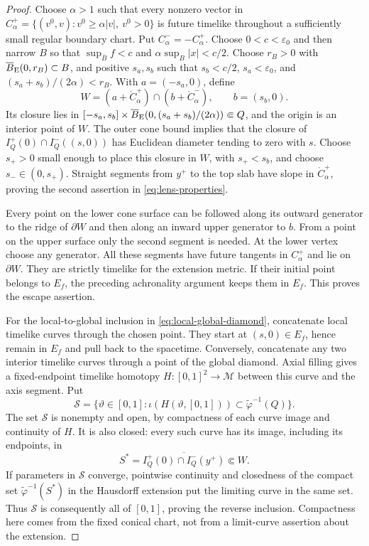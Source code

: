 \documentclass[10pt,a4paper]{article}
\numberwithin{equation}{section}
\theoremstyle{definition}
\theoremstyle{remark}
\newcommand{\cM}{\mathcal M}
\newcommand{\eps}{\varepsilon}
\begin{document}
\begin{proof}
Choose $\alpha>1$ such that every nonzero vector in
$C_\alpha^+=\{(v^0,v):v^0\ge\alpha|v|,\ v^0>0\}$ is future timelike
throughout a sufficiently small regular boundary chart.  Put
$C_\alpha^-=-C_\alpha^+$.  Choose $0<c<\eps_0$ and then narrow $B$ so that
$\sup_{\overline B}f<c$ and $\alpha\sup_B|x|<c/2$.
Choose $r_B>0$ with $\overline B_{\rm E}(0,r_B)\subset B$, and positive
$s_a,s_b$ such that $s_b<c/2$, $s_a<\eps_0$, and
$(s_a+s_b)/(2\alpha)<r_B$.  With $a=(-s_a,0)$, define
\[
 W=(a+\mathring C_\alpha^+)\cap(b+\mathring C_\alpha^-),
 \qquad b=(s_b,0).
\]
Its closure lies in
$[-s_a,s_b]\times\overline B_{\rm E}(0,(s_a+s_b)/(2\alpha))\Subset Q$,
and the origin is an interior point of $W$.  The outer cone bound implies
that the closure of $I_Q^+(0)\cap I_Q^-((s,0))$ has Euclidean diameter
tending to zero with $s$.  Choose $s_+>0$ small enough to place this
closure in $W$, with $s_+<s_b$, and choose $s_-\in(0,s_+)$.
Straight segments from $y^+$ to the top slab have slope in
$\mathring C_\alpha^+$, proving the second assertion in
\eqref{eq:lens-properties}.

Every point on the lower cone surface can be followed along its outward
generator to the ridge of $\partial W$ and then along an inward upper
generator to $b$.  From a point on the upper surface only the second
segment is needed.  At the lower vertex choose any generator.  All these
segments have future tangents in $C_\alpha^+$ and lie on $\partial W$.
They are strictly timelike for the extension metric.  If their initial
point belongs to $E_f$, the preceding achronality argument keeps them in
$E_f$.  This proves the escape assertion.

For the local-to-global inclusion in \eqref{eq:local-global-diamond},
concatenate local timelike curves through the chosen point.  They start
at $(s,0)\in E_f$, hence remain in $E_f$ and pull back to the spacetime.
Conversely, concatenate any two interior timelike curves through a point
of the global diamond.  Axial filling gives a fixed-endpoint timelike
homotopy $H:[0,1]^2\to\cM$ between this curve and the axis segment.  Put
\[
 \mathcal S=\{\vartheta\in[0,1]:
 \iota(H(\vartheta,[0,1]))\subset\widetilde\varphi^{-1}(Q)\}.
\]
The set $\mathcal S$ is nonempty and open, by compactness of each curve
image and continuity of $H$.  It is also closed:
every such curve has its image, including its endpoints, in
\[
 S^*=\overline{I_Q^+(0)\cap I_Q^-(y^+)}\Subset W.
\]
If parameters in $\mathcal S$ converge, pointwise continuity and closedness of the
compact set $\widetilde\varphi^{-1}(S^*)$ in the Hausdorff extension put
the limiting curve in the same set.  Thus $\mathcal S$ is consequently
all of $[0,1]$, proving the reverse inclusion.  Compactness here comes
from the fixed conical chart, not from a limit-curve assertion about the
extension.


\end{proof}
\end{document}
